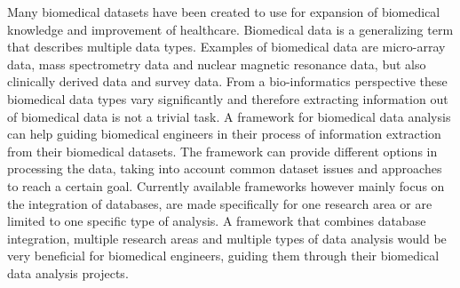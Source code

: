 \documentclass[10pt,a4paper]{article}
\begin{document}
	Many biomedical datasets have been created to use for expansion of biomedical knowledge and improvement of healthcare. Biomedical data is a generalizing term that describes multiple data types\cite{gehlenborg2010visualization}. Examples of biomedical data are micro-array data\cite{brazma2001minimum}, mass spectrometry data\cite{cottrell1999probability, dettmer2007mass} and nuclear magnetic resonance data\cite{capitani2017nuclear}, but also clinically derived data\cite{liu2012data, sittig2008grand} and survey data\cite{magni1990chronic}. From a bio-informatics perspective these biomedical data types vary significantly\cite{gehlenborg2010visualization} and therefore extracting information out of biomedical data is not a trivial task. A framework for biomedical data analysis can help guiding biomedical engineers in their process of information extraction from their biomedical datasets. The framework can provide different options in processing the data, taking into account common dataset issues\cite{bertolazzi2008logic, piatetsky2003microarray,lommen2009metalign} and approaches to reach a certain goal\cite{holzinger2014knowledge, wilkins2009proteomics}. Currently available frameworks however mainly focus on the integration of databases\cite{teodoro2009biomedical, doi:10.1093/nar/gkm1037}, are made specifically for one research area\cite{sturn2002genesis, karnovsky2011metscape, tabas2012genecodis3} or are limited to one specific type of analysis\cite{faul2007g}. A framework that combines database integration, multiple research areas and multiple types of data analysis would be very beneficial for biomedical engineers, guiding them through their biomedical data analysis projects.
	
\end{document}
